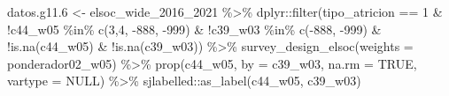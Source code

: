 \documentclass[
  12pt,
]{book}
\newenvironment{Shaded}{\begin{snugshade}}{\end{snugshade}}
\newcommand{\AttributeTok}[1]{\textcolor[rgb]{0.77,0.63,0.00}{#1}}
\newcommand{\ConstantTok}[1]{\textcolor[rgb]{0.00,0.00,0.00}{#1}}
\newcommand{\DecValTok}[1]{\textcolor[rgb]{0.00,0.00,0.81}{#1}}
\newcommand{\FloatTok}[1]{\textcolor[rgb]{0.00,0.00,0.81}{#1}}
\newcommand{\FunctionTok}[1]{\textcolor[rgb]{0.00,0.00,0.00}{#1}}
\newcommand{\NormalTok}[1]{#1}
\newcommand{\OtherTok}[1]{\textcolor[rgb]{0.56,0.35,0.01}{#1}}
\newcommand{\SpecialCharTok}[1]{\textcolor[rgb]{0.00,0.00,0.00}{#1}}
\newcommand{\StringTok}[1]{\textcolor[rgb]{0.31,0.60,0.02}{#1}}
\begin{document}
\begin{Shaded}
\begin{Highlighting}[]
\NormalTok{datos.g11}\FloatTok{.6} \OtherTok{\textless{}{-}}\NormalTok{ elsoc\_wide\_2016\_2021 }\SpecialCharTok{\%\textgreater{}\%} 
\NormalTok{  dplyr}\SpecialCharTok{::}\FunctionTok{filter}\NormalTok{(tipo\_atricion }\SpecialCharTok{==} \DecValTok{1} 
                \SpecialCharTok{\&} \SpecialCharTok{!}\NormalTok{c44\_w05 }\SpecialCharTok{\%in\%} \FunctionTok{c}\NormalTok{(}\DecValTok{3}\NormalTok{,}\DecValTok{4}\NormalTok{, }\SpecialCharTok{{-}}\DecValTok{888}\NormalTok{, }\SpecialCharTok{{-}}\DecValTok{999}\NormalTok{)}
                \SpecialCharTok{\&} \SpecialCharTok{!}\NormalTok{c39\_w03 }\SpecialCharTok{\%in\%} \FunctionTok{c}\NormalTok{(}\SpecialCharTok{{-}}\DecValTok{888}\NormalTok{, }\SpecialCharTok{{-}}\DecValTok{999}\NormalTok{) }\SpecialCharTok{\&} \SpecialCharTok{!}\FunctionTok{is.na}\NormalTok{(c44\_w05) }\SpecialCharTok{\&} \SpecialCharTok{!}\FunctionTok{is.na}\NormalTok{(c39\_w03)) }\SpecialCharTok{\%\textgreater{}\%} 
  \FunctionTok{survey\_design\_elsoc}\NormalTok{(}\AttributeTok{weights =} \StringTok{\textquotesingle{}ponderador02\_w05\textquotesingle{}}\NormalTok{) }\SpecialCharTok{\%\textgreater{}\%} 
  \FunctionTok{prop}\NormalTok{(c44\_w05, }\AttributeTok{by =}\NormalTok{ c39\_w03, }\AttributeTok{na.rm =} \ConstantTok{TRUE}\NormalTok{, }\AttributeTok{vartype =} \ConstantTok{NULL}\NormalTok{) }\SpecialCharTok{\%\textgreater{}\%} 
\NormalTok{  sjlabelled}\SpecialCharTok{::}\FunctionTok{as\_label}\NormalTok{(c44\_w05, c39\_w03) }


\end{Highlighting}
\end{Shaded}
\end{document}
